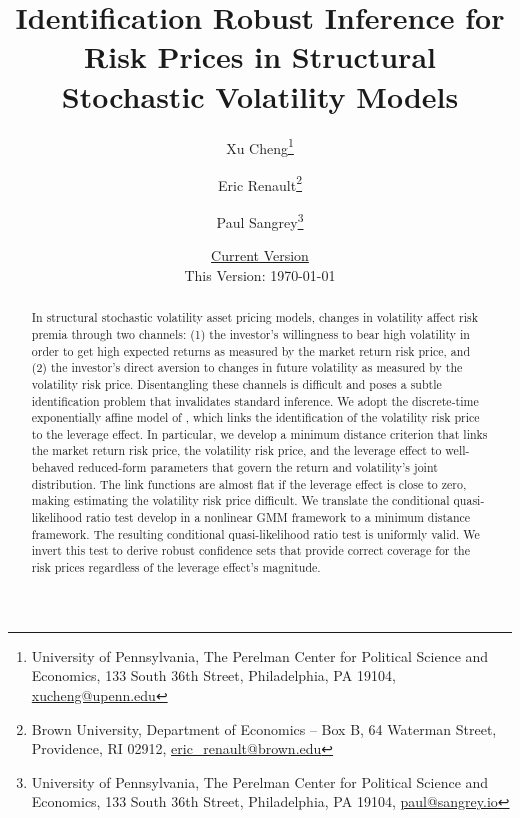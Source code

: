 \documentclass[11pt, letterpaper, twoside]{article}
\author{Xu Cheng\thanks{University of Pennsylvania, The Perelman Center for Political Science and Economics, 133 South 36th Street, Philadelphia, PA 19104, \href{mailto:xucheng@upenn.edu}{xucheng@upenn.edu}} \and Eric Renault\thanks{Brown University, Department of Economics -- Box B, 64 Waterman Street, Providence, RI 02912, \href{mailto:eric_renault@brown.edu}{eric\_renault@brown.edu}} \and Paul Sangrey\thanks{University of Pennsylvania, The Perelman Center for Political Science and Economics, 133 South 36th Street, Philadelphia, PA 19104, \href{mailto:paul@sangrey.io}{paul@sangrey.io}}}
\title{Identification Robust Inference for Risk Prices in Structural Stochastic Volatility Models}
\date{\href{http://sangrey.io/risk_price_inference.pdf}{Current Version} \protect\\ This Version: \today}
\begin{document}
\begin{titlepage}


\maketitle
\thispagestyle{empty}
\addtocounter{page}{-1}

\begin{abstract} 

\singlespacing \noindent 
In structural stochastic volatility asset pricing models, changes in volatility affect risk premia through two channels: (1) the investor's willingness to bear high volatility in order to get high expected returns as measured by the market return risk price, and (2) the investor’s direct aversion to changes in future volatility as measured by the volatility risk price. Disentangling these channels is difficult and poses a subtle identification problem that invalidates standard inference. We adopt the discrete-time exponentially affine model of \textcite{han2018leverage}, which links the identification of the volatility risk price to the leverage effect. In particular, we develop a minimum distance criterion that links the market return risk price, the volatility risk price, and the leverage effect to well-behaved reduced-form parameters that govern the return and volatility's joint distribution. The link functions are almost flat if the leverage effect is close to zero, making estimating the volatility risk price difficult. We translate the conditional quasi-likelihood ratio test \textcite{andrews2016conditional} develop in a nonlinear GMM framework to a minimum distance framework. The resulting conditional quasi-likelihood ratio test is uniformly valid. We invert this test to derive robust confidence sets that provide correct coverage for the risk prices regardless of the leverage effect's magnitude. 
%
\end{abstract} 

\medskip
{}

\medskip


\end{titlepage}

\clearpage


\printbibliography 

\begin{appendices}
    

\end{appendices}
\end{document}
